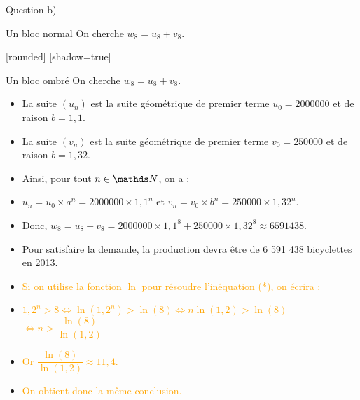 \begin{frame}[allowframebreaks]{Question b)}


\label{départ}

\pause
\begin{block}{Un bloc normal}
On cherche $w_8=u_8+v_8$.
\end{block}	

\pause	
{}[rounded]
[shadow=true]	
	\begin{block}{Un bloc ombré}
On cherche $w_8=u_8+v_8$.
\end{block}

\begin{itemize}		
	\item La suite $(u_n)$ est la suite géométrique de premier terme $u_0=2 000 000$ et de raison $b=1,1$.
		
	\item La suite $(v_n)$ est la suite géométrique de premier terme $v_0=250 000$ et de raison $b=1,32$.
	
	\item Ainsi, pour tout $n \in \N$, on a :
	
	\item $u_n=u_0 \times a^n=2 000 000 \times 1,1^n$ et $v_n=v_0 \times b^n=250 000 \times 1,32^n$.
	
	\item Donc, $w_8=u_8+v_8=2 000 000 \times 1,1^8 + 250 000 \times 1,32^8 \approx 6 591 438$.
	
	\item Pour satisfaire la demande, la production devra être de 6 591 438 bicyclettes en 2013.
	
	\item\textcolor{orange}{Si on utilise la fonction $\ln$ pour résoudre l'inéquation (*), on écrira :}
		
	\pause\item\textcolor{orange}{$1,2^n > 8 \Leftrightarrow \ln \left( 1,2^n\right) > \ln (8) \Leftrightarrow n \ln (1,2) > \ln (8)$\\
	$\Leftrightarrow n > \dfrac{\ln(8)}{\ln(1,2)}$}
		
	\pause\item\textcolor{orange}{Or $\dfrac{\ln(8)}{\ln(1,2)} \approx 11,4$.}
	
	\pause\item\textcolor{orange}{On obtient donc la même conclusion.}
	
	\end{itemize}
\end{frame}


